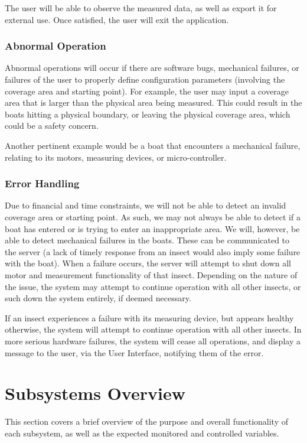\documentclass[11pt]{article}
\begin{document}
The user will be able to observe the measured data, as well as export it for external use. Once satisfied, the user will exit the application.
\subsubsection{Abnormal Operation}
Abnormal operations will occur if there are software bugs, mechanical failures, or failures of the user to properly define configuration parameters (involving the coverage area and starting point). For example, the user may input a coverage area that is larger than the physical area being measured. 
This could result in the boats hitting a physical boundary, or leaving the physical coverage area, which could be a safety concern.

Another pertinent example would be a boat that encounters a mechanical failure, relating to its motors, measuring devices, or micro-controller.
\subsubsection{Error Handling}
Due to financial and time constraints, we will not be able to detect an invalid coverage area or starting point. As such, we may not always be able
to detect if a boat has entered or is trying to enter an inappropriate area. We will, however, be able to detect mechanical failures in the boats.
These can be communicated to the server (a lack of timely response from an insect would also imply some failure with the boat). When a failure occurs,
the server will attempt to shut down all motor and measurement functionality of that insect. Depending on the nature of the issue, the system
may attempt to continue operation with all other insects, or such down the system entirely, if deemed necessary.

If an insect experiences a failure with its measuring device, but appears healthy otherwise, the system will attempt to continue operation with
all other insects. In more serious hardware failures, the system will cease all operations, and display a message to the user, via the User Interface,
notifying them of the error.
\section{Subsystems Overview}

This section covers a brief overview of the purpose and overall functionality of each subsystem, as well as the expected
monitored and controlled variables.
\end{document}
